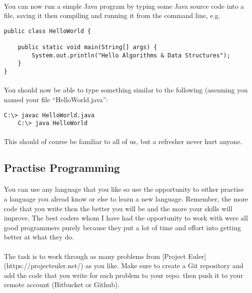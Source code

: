 \documentclass[10pt, a4paper, twosize]{article}
\begin{document}
\paragraph{} You can now run a simple Java program by typing some Java source code into a file, saving it then compiling and running it from the command line, e.g.

\begin{lstlisting}
public class HelloWorld {

	public static void main(String[] args) {
		System.out.println("Hello Algorithms & Data Structures");
	}
}
\end{lstlisting}

\paragraph{} You should now be able to type something similar to the following (assuming you named your file ``HelloWorld.java'':

\begin{lstlisting}[style=DOS]
    C:\> javac HelloWorld.java
    C:\> java HelloWorld
\end{lstlisting}

\paragraph{} This should of course be familiar to all of us, but a refresher never hurt anyone.

\subsection{Practise Programming}

\paragraph{} You can use any language that you like so use the opportunity to either practise a language you alread know or else to learn a new language. Remember, the more code that you write then the better you will be and the more your skills will improve. The best coders whom I have had the opportunity to work with were all good programmers purely because they put a lot of time and effort into getting better at what they do. 

\paragraph{} The task is to work through as many problems from [Project Euler](https://projecteuler.net/) as you like. Make sure to create a Git repository and add the code that you write for each problem to your repo. then push it to your remote account (Bitbucket or Github).
\end{document}
